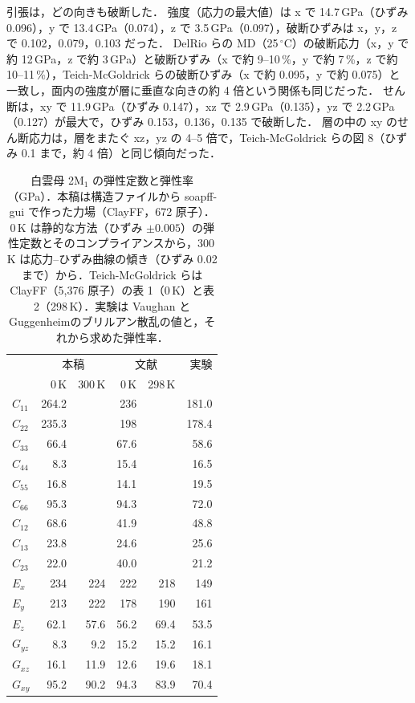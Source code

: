 \documentclass[a4paper,11pt]{article}
\begin{document}
引張は，どの向きも破断した．
強度（応力の最大値）は x で 14.7\,GPa（ひずみ 0.096），y で 13.4\,GPa（0.074），z で 3.5\,GPa（0.097），破断ひずみは x，y，z で 0.102，0.079，0.103 だった．
DelRio らの MD（25\,$^\circ$C）の破断応力（x，y で約 12\,GPa，z で約 3\,GPa）と破断ひずみ（x で約 9--10\,\%，y で約 7\,\%，z で約 10--11\,\%），Teich-McGoldrick らの破断ひずみ（x で約 0.095，y で約 0.075）と一致し，面内の強度が層に垂直な向きの約 4 倍という関係も同じだった．
せん断は，xy で 11.9\,GPa（ひずみ 0.147），xz で 2.9\,GPa（0.135），yz で 2.2\,GPa（0.127）が最大で，ひずみ 0.153，0.136，0.135 で破断した．
層の中の xy のせん断応力は，層をまたぐ xz，yz の 4--5 倍で，Teich-McGoldrick らの図 8（ひずみ 0.1 まで，約 4 倍）と同じ傾向だった．

\begin{table}[!htbp]
\centering
\caption{白雲母 2M$_1$ の弾性定数と弾性率（GPa）．本稿は構造ファイルから soapff-gui で作った力場（ClayFF，672 原子）．0\,K は静的な方法（ひずみ $\pm0.005$）の弾性定数とそのコンプライアンスから，300\,K は応力--ひずみ曲線の傾き（ひずみ 0.02 まで）から．Teich-McGoldrick ら\cite{teich2012}は ClayFF（5{,}376 原子）の表 1（0\,K）と表 2（298\,K）．実験は Vaughan と Guggenheim\cite{vaughan1986}のブリルアン散乱の値と，それから求めた弾性率．}
\label{tab:musc}
\small
\begin{tabular}{lrrrrr}
\toprule
 & \multicolumn{2}{c}{本稿} & \multicolumn{2}{c}{文献\cite{teich2012}} & 実験\cite{vaughan1986} \\
 & 0\,K & 300\,K & 0\,K & 298\,K & \\
\midrule
$C_{11}$ & 264.2 & & 236 & & 181.0 \\
$C_{22}$ & 235.3 & & 198 & & 178.4 \\
$C_{33}$ & 66.4 & & 67.6 & & 58.6 \\
$C_{44}$ & 8.3 & & 15.4 & & 16.5 \\
$C_{55}$ & 16.8 & & 14.1 & & 19.5 \\
$C_{66}$ & 95.3 & & 94.3 & & 72.0 \\
$C_{12}$ & 68.6 & & 41.9 & & 48.8 \\
$C_{13}$ & 23.8 & & 24.6 & & 25.6 \\
$C_{23}$ & 22.0 & & 40.0 & & 21.2 \\
\midrule
$E_x$ & 234 & 224 & 222 & 218 & 149 \\
$E_y$ & 213 & 222 & 178 & 190 & 161 \\
$E_z$ & 62.1 & 57.6 & 56.2 & 69.4 & 53.5 \\
$G_{yz}$ & 8.3 & 9.2 & 15.2 & 15.2 & 16.1 \\
$G_{xz}$ & 16.1 & 11.9 & 12.6 & 19.6 & 18.1 \\
$G_{xy}$ & 95.2 & 90.2 & 94.3 & 83.9 & 70.4 \\
\bottomrule
\end{tabular}
\end{table}
\end{document}
